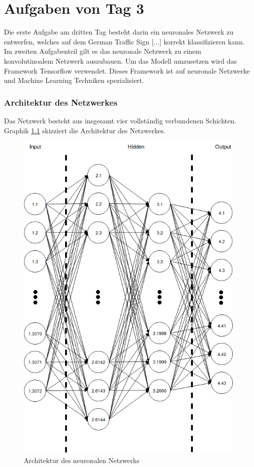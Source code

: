 \chapter{Aufgaben von Tag 3}

Die erste Aufgabe am dritten Tag besteht darin ein neuronales Netzwerk zu entwerfen, welches auf dem German Traffic Sign [...] 
korrekt klassifizieren kann. Im zweiten Aufgabenteil gilt es das neuronale Netzwerk zu einem konvolutinoalem Netzwerk auszubauen.
Um das Modell umzusetzen wird das Framework Tensorflow verwendet. Dieses Framework ist auf neuronale Netzwerke und Machine Learning 
Techniken spezialisiert. 

\subsection{Architektur des Netzwerkes}
Das Netzwerk besteht aus insgesamt vier vollständig verbundenen Schichten. Graphik \ref{img:nn_arch} skizziert die Architektur 
des Netzwerkes.
\begin{figure}
    \label{img:nn_arch}
    \includegraphics{Bilder/NeuralNetwork.png}
    \caption{Architektur des neuronalen Netzwerks}
\end{figure}
